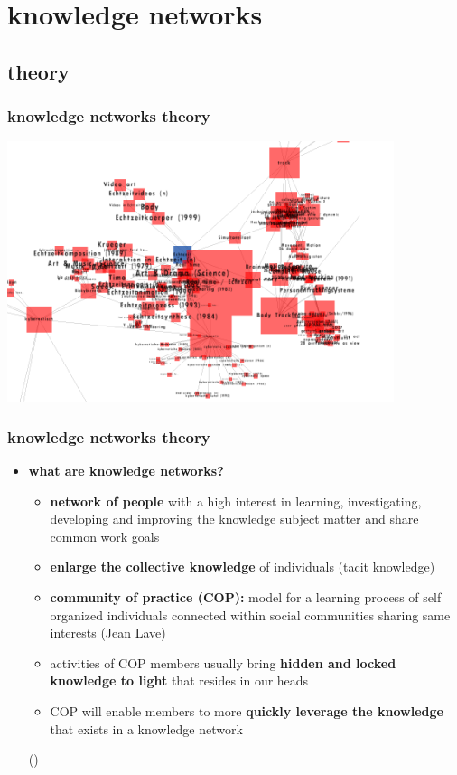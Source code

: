 \documentclass[blue]{beamer}
\begin{document}

\section{knowledge networks}
\subsection{theory}
\frame
{
\frametitle{\textbf{knowledge networks theory}}
\includegraphics[width=0.85\textwidth]{bin/semaspace/semaspace.png}
}

\frame
{
\frametitle{\textbf{knowledge networks theory}}
\begin{itemize}
	\item \textbf{what are knowledge networks?}
	\begin{itemize}
		\item \textbf{network of people} with a high interest in learning, investigating, developing and improving the knowledge subject matter and share common work goals
		\item \textbf{enlarge the collective knowledge} of individuals (tacit knowledge)
		\item \textbf{community of practice (COP):} model for a learning process of self organized individuals connected within social communities sharing same interests (Jean Lave)
		\item activities of COP members usually bring \textbf{hidden and locked knowledge to light} that resides in our heads
		\item COP will enable members to more \textbf{quickly leverage the knowledge} that exists in a knowledge network
	\end{itemize}
	()
\end{itemize}
}
\end{document}
